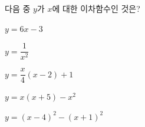 다음 중 $y$가 $x$에 대한 이차함수인 것은?
\begin{choicesii}{\rule[-3ex]{0pt}{8ex}$y=6x-3$}{\rule[-3ex]{0pt}{8ex}$y=\dfrac{1}{x^2}$}{\rule[-3ex]{0pt}{8ex}$y=\dfrac{x}{4}(x-2)+1$}{\rule[-3ex]{0pt}{8ex}$y=x(x+5)-x^2$}{\rule[-3ex]{0pt}{8ex}$y=(x-4)^2-(x+1)^2$}\end{choicesii}
